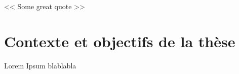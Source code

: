 \begin{savequote}[6cm]
<< Some great quote  >>
\end{savequote}
\chapter{Contexte et objectifs de la thèse}
\chaptertoc

Lorem Ipsum blablabla


